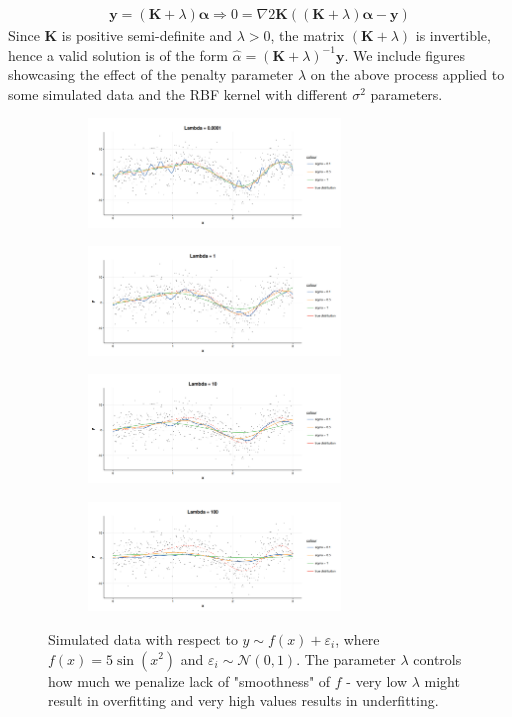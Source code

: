\documentclass[10pt,twoside,openany,final]{memoir}
\theoremstyle{definition}
\theoremstyle{Break}
\begin{document}
\begin{align*}
	  \textbf{y} = (\textbf{K}+\lambda)\pmb \alpha \Longrightarrow 0 = \nabla 2 \textbf{K}( ( \textbf{K}+ \lambda)\pmb \alpha-\textbf{y})
\end{align*}
Since $\textbf{K}$ is positive semi-definite and $\lambda>0$, the matrix $(\textbf{K}+\lambda)$ is invertible, hence a valid solution is of the form $\hat{\alpha}=(\textbf{K}+\lambda)^{-1} \textbf{y}$. We include figures showcasing the effect of the penalty parameter $\lambda$ on the above process applied to some simulated data and the RBF kernel with different $\sigma^2$ parameters.
\begin{figure}[h]
	\begin{subfigure}{6.7cm}
		\centering\includegraphics[width=6.7cm]{fig/0d0001.png}
	\end{subfigure}
	\begin{subfigure}{6.7cm}
		\centering\includegraphics[width=6.7cm]{fig/1.png}
	\end{subfigure}
	\begin{subfigure}{6.7cm}
		\centering\includegraphics[width=6.7cm]{fig/10.png}
	\end{subfigure}
	\begin{subfigure}{6.7cm}
		\centering\includegraphics[width=6.7cm]{fig/100.png}
	\end{subfigure}
	\caption{Simulated data with respect to $y\sim f(x)+\varepsilon_i$, where $f(x)=5\sin(x^2)$ and $\varepsilon_i\sim\mathcal{N}(0,1)$. The parameter $\lambda$ controls how much we penalize lack of "smoothness" of $f$ - very low $\lambda$ might result in overfitting and very high values results in underfitting.}
\end{figure}
\end{document}
